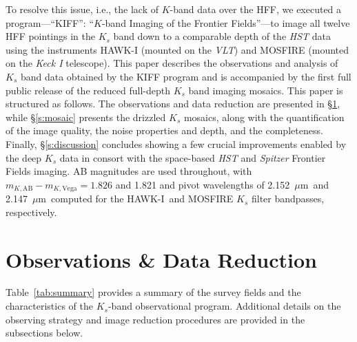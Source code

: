 \documentclass[preprint2]{aastex6}
\gdef\mum{$\mu\mathrm{m}$}
\gdef\HAWKI{\mbox{HAWK-I}}
\begin{document}
To resolve this issue, i.e., the lack of $K$-band data over the HFF, we executed a program---``KIFF'': ``$K$-band Imaging of the Frontier Fields''---to image all twelve HFF pointings in the $K_s$ band down to a comparable depth of the {\it HST} data using the instruments HAWK-I (mounted on the {\it VLT}) and MOSFIRE (mounted on the {\it Keck I} telescope). This paper describes the observations and analysis of $K_s$ band data obtained by the KIFF program and is accompanied by the first full public release of the reduced full-depth $K_s$ band imaging mosaics. This paper is structured as follows. The observations and data reduction are presented in \S\ref{s:observations}, while \S\ref{s:mosaic} presents the drizzled $K_s$ mosaics, along with the quantification of the image quality, the noise properties and depth, and the completeness. Finally, \S\ref{s:discussion} concludes showing a few crucial improvements enabled by the deep $K_s$ data in consort with the space-based \textit{HST} and \textit{Spitzer} Frontier Fields imaging.  AB magnitudes are used throughout, with $m_{K, \mathrm{AB}} - m_{K, \mathrm{Vega}} = 1.826$ and 1.821 and pivot wavelengths \citep{tokunaga:05} of 2.152~\mum\ and 2.147~\mum\ computed for the \HAWKI\ and MOSFIRE $K_s$ filter bandpasses, respectively. 


\section{Observations \& Data Reduction}
\label{s:observations}

Table~\ref{tab:summary} provides a summary of the survey fields and the characteristics of the $K_s$-band observational program.  Additional details on the observing strategy and image reduction procedures are provided in the subsections below.
\end{document}
